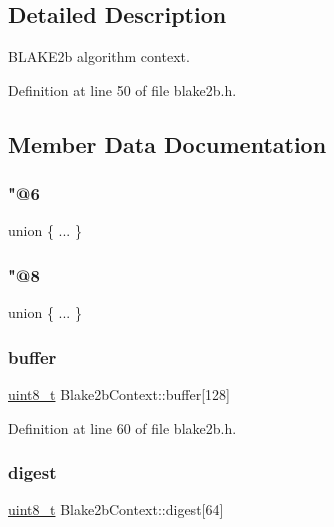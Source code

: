 \subsection{Detailed Description}
B\+L\+A\+K\+E2b algorithm context. 

Definition at line 50 of file blake2b.\+h.



\subsection{Member Data Documentation}
\mbox{\label{structBlake2bContext_af7285bab7a5cd0b7afea9b16a6132365}} 
\subsubsection{\texorpdfstring{"@6}{@6}}
{\footnotesize\ttfamily union \{ ... \} }

\mbox{\label{structBlake2bContext_a3da9195dd2143bc49fe4b9e127b89a8b}} 
\subsubsection{\texorpdfstring{"@8}{@8}}
{\footnotesize\ttfamily union \{ ... \} }

\mbox{\label{structBlake2bContext_a4c6fd944f37989469757f2b83dc1fbd1}} 
\subsubsection{\texorpdfstring{buffer}{buffer}}
{\footnotesize\ttfamily \hyperlink{stdint_8h_aba7bc1797add20fe3efdf37ced1182c5}{uint8\+\_\+t} Blake2b\+Context\+::buffer\mbox{[}128\mbox{]}}



Definition at line 60 of file blake2b.\+h.

\mbox{\label{structBlake2bContext_a52c4b94d32c916bd5b9a0cfac711f46a}} 
\subsubsection{\texorpdfstring{digest}{digest}}
{\footnotesize\ttfamily \hyperlink{stdint_8h_aba7bc1797add20fe3efdf37ced1182c5}{uint8\+\_\+t} Blake2b\+Context\+::digest\mbox{[}64\mbox{]}}



